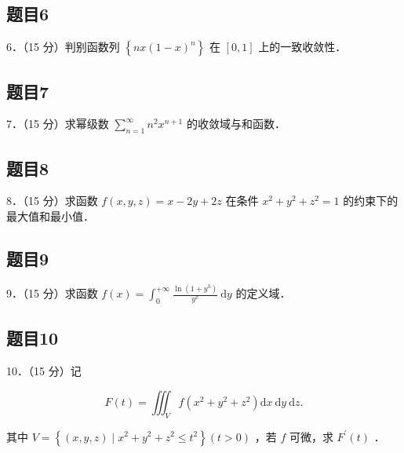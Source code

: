 \documentclass{article}
\begin{document}
\subsection{题目6}
6．（15 分）判别函数列 \(\left\{n x(1-x)^{n}\right\}\) 在 \([0,1]\) 上的一致收敛性．

\subsection{题目7}
7．（15 分）求幂级数 \(\sum_{n=1}^{\infty} n^{2} x^{n+1}\) 的收敛域与和函数．

\subsection{题目8}
8．（15 分）求函数 \(f(x, y, z)=x-2 y+2 z\) 在条件 \(x^{2}+y^{2}+z^{2}=1\) 的约束下的最大值和最小值．

\subsection{题目9}
9．（15 分）求函数 \(f(x)=\int_{0}^{+\infty} \frac{\ln \left(1+y^{3}\right)}{y^{x}} \mathrm{~d} y\) 的定义域．

\subsection{题目10}
10．（15 分）记

\[
F(t)=\iiint_{V} f\left(x^{2}+y^{2}+z^{2}\right) \mathrm{d} x \mathrm{~d} y \mathrm{~d} z .
\]

其中 \(V=\left\{(x, y, z) \mid x^{2}+y^{2}+z^{2} \leq t^{2}\right\}(t>0)\) ，若 \(f\) 可微，求 \(F^{\prime}(t)\) ．
\end{document}
